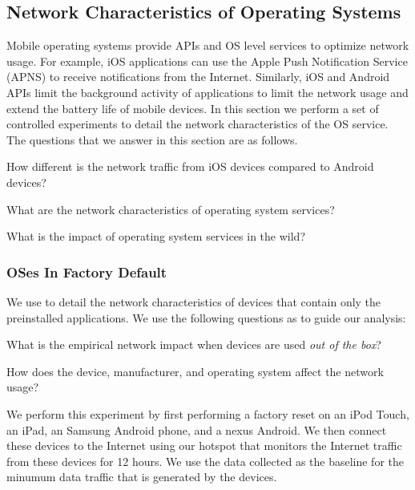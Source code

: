 \subsection{Network Characteristics of Operating Systems}
\label{sec:characterize-os}

Mobile operating systems provide APIs and OS level services to optimize network usage.
For example, iOS applications can use the Apple Push Notification Service (APNS) to receive notifications from the Internet. 
Similarly, iOS and Android APIs limit the background activity of applications to limit the network usage and extend the battery life of mobile devices. 
In this section we perform a set of controlled experiments to detail the network characteristics of the OS service.
The questions that we answer in this section are as follows.
\begin{packedenumerate}
\item How different is the network traffic from iOS devices compared to Android devices?
\item What are the network characteristics of operating system services?
\item What is the impact of operating system services in the wild? 
\end{packedenumerate}

\subsubsection{OSes In Factory Default}

We use \platname to detail the network characteristics of devices that contain only the preinstalled applications.
We use the following questions as to guide our analysis: 
\begin{packedenumerate}
\item What is the empirical network impact when devices are used \emph{out of the box}? 
\item How does the device, manufacturer, and operating system affect the network usage?
\end{packedenumerate}

We perform this experiment by first performing a factory reset on an iPod Touch, an iPad, an Samsung Android phone, and a nexus Android.
We then connect these devices to the Internet using our \wifi hotspot that monitors the Internet traffic from these devices for 12 hours. 
We use the data collected as the baseline for the minumum data traffic that is generated by the devices. 

